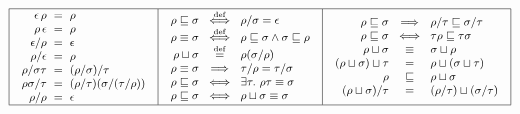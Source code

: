 \[
{\small
\begin{array}{|c|c|c|}
\hline
\begin{array}{r@{\hspace{0.2cm}}c@{\hspace{0.2cm}}l}
  \emptyDerivation\,\redseq & = & \redseq
\\
  \redseq\,\emptyDerivation & = & \redseq
\\
  \emptyDerivation/\redseq & = & \emptyDerivation
\\
  \redseq/\emptyDerivation & = & \redseq
\\
  \redseq/\redseqtwo\redseqthree & = & (\redseq/\redseqtwo)/\redseqthree
\\
  \redseq\redseqtwo/\redseqthree & = & (\redseq/\redseqthree)(\redseqtwo/(\redseqthree/\redseq))
\\
  \redseq/\redseq & = & \emptyDerivation
\end{array}
&
\begin{array}{r@{\hspace{0.2cm}}c@{\hspace{0.2cm}}l}
  \redseq \permle \redseqtwo & \iffdef & \redseq/\redseqtwo = \emptyDerivation
\\
  \redseq \permeq \redseqtwo & \iffdef & \redseq \permle \redseqtwo \land \redseqtwo \permle \redseq
\\
  \redseq \sqcup \redseqtwo  & \eqdef & \redseq(\redseqtwo/\redseq) 
\\
  \redseq \permeq \redseqtwo & \implies & \redseqthree/\redseq = \redseqthree/\redseqtwo
\\
  \redseq \permle \redseqtwo & \iff & \exists \redseqthree.\ \redseq\redseqthree \permeq \redseqtwo
\\
  \redseq \permle \redseqtwo & \iff & \redseq \sqcup \redseqtwo \permeq \redseqtwo
\end{array}
&
\begin{array}{r@{\hspace{0.2cm}}c@{\hspace{0.2cm}}l}
  \redseq \permle \redseqtwo & \implies & \redseq/\redseqthree \permle \redseqtwo/\redseqthree
\\
  \redseq \permle \redseqtwo & \iff & \redseqthree\redseq \permle \redseqthree\redseqtwo
\\
  \redseq \sqcup \redseqtwo  & \permeq & \redseqtwo \sqcup \redseq
\\
  (\redseq \sqcup \redseqtwo) \sqcup \redseqthree & = & \redseq \sqcup (\redseqtwo \sqcup \redseqthree)
\\
  \redseq & \permle & \redseq \sqcup \redseqtwo
\\
  (\redseq \sqcup \redseqtwo)/\redseqthree & = & (\redseq/\redseqthree) \sqcup (\redseqtwo/\redseqthree) \\
\end{array}
\\
\hline
\end{array}
}
\]

